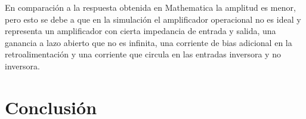 \documentclass[10pt,a4paper]{article} %
\begin{document}

En comparación a la respuesta obtenida en Mathematica la amplitud es menor, pero esto se debe a que en la simulación el amplificador operacional no es ideal y representa un amplificador con cierta impedancia de entrada y salida, una ganancia a lazo abierto que no es infinita, una corriente de bias adicional en la retroalimentación y una corriente que circula en las entradas inversora y no inversora.

\section{Conclusión}
\end{document}
